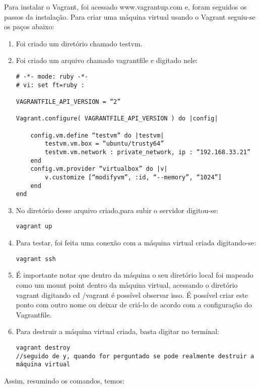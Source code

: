 Para instalar o Vagrant, foi acessado www.vagrantup.com e, 
foram seguidos os passos da instalação. Para criar uma 
máquina virtual usando o Vagrant seguiu-se os paços
abaixo:
\begin{enumerate}
   \item Foi criado um diretório chamado testvm. 
   \item Foi criado um arquivo chamado vagrantfile e 
   digitado nele:
      \begin{lstlisting}
# -*- mode: ruby -*-
# vi: set ft=ruby :

VAGRANTFILE_API_VERSION = “2”

Vagrant.configure( VAGRANTFILE_API_VERSION ) do |config|

	config.vm.define “testvm” do |testvm|
		testvm.vm.box = “ubuntu/trusty64”
		testvm.vm.network : private_network, ip : “192.168.33.21”
	end
	config.vm.provider “virtualbox” do |v|
		v.customize [“modifyvm”, :id, “--memory”, “1024”]
	end
end
      \end{lstlisting}
  \item No diretório desse arquivo criado,para subir o 
  servidor digitou-se:
    \begin{lstlisting}
vagrant up
    \end{lstlisting}

      \item Para testar, foi feita uma conexão com a 
      máquina virtual criada digitando-se:
    \begin{lstlisting}
vagrant ssh
    \end{lstlisting}
   \item É importante notar que dentro da máquina 
    o seu diretório local foi mapeado como um mount 
   point dentro da máquina virtual, acessando o 
   diretório vagrant digitando cd /vagrant é possível 
   observar isso. É possível criar este ponto com 
   outro nome ou deixar de criá-lo de acordo com a 
   configuração do Vagrantfile.
   \item Para destruir a máquina virtual criada, 
   basta digitar no terminal: 
    \begin{lstlisting}
vagrant destroy
//seguido de y, quando for perguntado se pode realmente destruir a máquina virtual
    \end{lstlisting}
\end{enumerate}
Assim, resumindo os comandos, temos:
